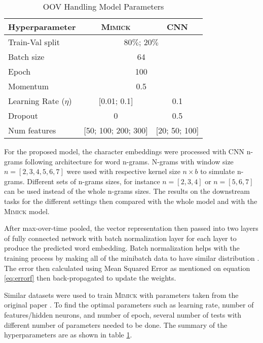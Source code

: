         \begin{table}[]
            \centering
            \caption{OOV Handling Model Parameters}
            \label{tab:hyperparameter}
            \begin{tabular}{@{}lcc@{}}
                \toprule
                \textbf{Hyperparameter} & \multicolumn{1}{c}{\textbf{\textsc{Mimick}}} & \multicolumn{1}{c}{\textbf{CNN}} \\ \midrule
                Train-Val split & \multicolumn{2}{c}{$80\%$; $20\%$}\\
                Batch size & \multicolumn{2}{c}{64} \\
                Epoch & \multicolumn{2}{c}{100} \\
                Momentum & \multicolumn{2}{c}{0.5} \\
                Learning Rate ($\eta$) & [0.01; 0.1] & 0.1 \\
                Dropout & 0 & 0.5 \\
                Num features & [50; 100; 200; 300] & [20; 50; 100] \\ \bottomrule
            \end{tabular}
        \end{table}

        For the proposed model, the character embeddings were
        processed with CNN n-grams following
        \cite{convolutional2014kim} architecture for word n-grams.
        N-grams with window size $n = [2, 3, 4, 5, 6, 7]$ were used
        with respective kernel size $n \times b$ to simulate n-grams.
        Different sets of n-grams sizes, for instance $n = [2, 3, 4]$
        or $n = [5, 6, 7]$ can be used instead of the whole n-grams
        sizes. The results on the downstream tasks for the different
        settings then compared with the whole model and with the
        \textsc{Mimick} model.
        
        After max-over-time pooled, the vector representation then
        passed into two layers of fully connected network with batch
        normalization layer for each layer to produce the predicted
        word embedding. Batch normalization helps with the training
        process by making all of the minibatch data to have similar
        distribution \citep{batchnorm:DBLP:journals/corr/IoffeS15}.
        The error then calculated using Mean Squared Error as
        mentioned on equation \ref{eq:errorf} then back-propagated to
        update the weights.

        Similar datasets were used to train \textsc{Mimick} with
        parameters taken from the original paper
        \citep{mimicking2017Pinter}. To find the optimal parameters
        such as learning rate, number of features/hidden neurons, and
        number of epoch, several number of tests with different number
        of parameters needed to be done. The summary of the
        hyperparameters are as shown in table
        \ref{tab:hyperparameter}.

